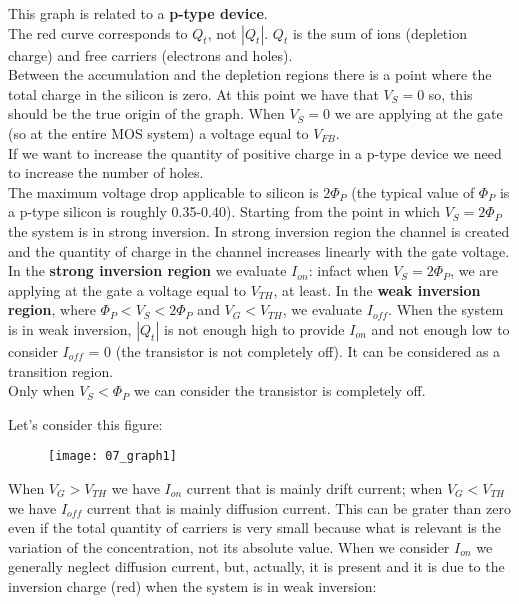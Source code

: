 \documentclass[a4paper, 12pt, twoside, openright]{report}
\begin{document}
This graph is related to a \textbf{p-type device}.\\
The red curve corresponds to $Q_{t}$, not $|Q_{t}|$. $Q_{t}$ is the sum of ions (depletion charge) and free carriers (electrons and holes).\\
Between the accumulation and the depletion regions there is a point where the total charge in the silicon is zero. At this point we have that $V_S = 0$ so, this should be the true origin of the graph. When $V_S = 0$ we are applying at the gate (so at the entire MOS system) a voltage equal to $V_{FB}$.\\
If we want to increase the quantity of positive charge in a p-type device we need to increase the number of holes.\\
The maximum voltage drop applicable to silicon is $2\Phi_P$ (the typical value of $\Phi_P$ is a p-type silicon is roughly 0.35-0.40). Starting from the point in which $V_S = 2\Phi_P$ the system is in strong inversion. In strong inversion region the channel is created and the quantity of charge in the channel increases linearly with the gate voltage. In the \textbf{strong inversion region} we evaluate $I_{on}$: infact when $V_S = 2\Phi_P$, we are applying at the gate a voltage equal to $V_{TH}$, at least. In the \textbf{weak inversion region}, where $ \Phi_P < V_S < 2\Phi_P$ and $V_G < V_{TH}$, we evaluate $I_{off}$. When the system is in weak inversion, $|Q_{t}|$ is not enough high to provide $I_{on}$ and not enough low to consider $I_{off}$ = 0 (the transistor is not completely off). It can be considered as a transition region.\\
Only when $V_S < \Phi_P$ we can consider the transistor is completely off.

Let's consider this figure:

	\begin{figure}[H]
	\centering
	\texttt{[image: 07\_graph1]}
	\caption{}
	\label{}
	\end{figure}

When $V_G > V_{TH}$ we have $I_{on}$ current that is mainly drift current; when $V_G < V_{TH}$ we have $I_{off}$ current that is mainly diffusion current. This can be grater than zero even if the total quantity of carriers is very small because what is relevant is the variation of the concentration, not its absolute value. When we consider $I_{on}$ we generally neglect diffusion current, but, actually, it is present and it is due to the inversion charge (red) when the system is in weak inversion:
\end{document}
